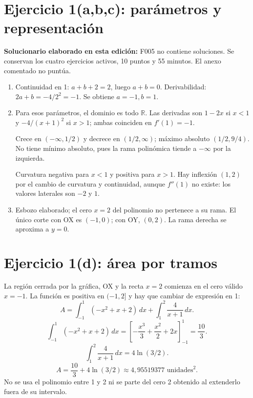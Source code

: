 \documentclass[11pt]{article}
\begin{document}
\section*{Ejercicio 1(a,b,c): parámetros y representación}
\textbf{Solucionario elaborado en esta edición:} F005 no contiene soluciones. Se conservan los cuatro ejercicios activos, 10 puntos y 55 minutos. El anexo comentado no puntúa.
\begin{enumerate}[label=(\alph*)]
\item Continuidad en 1: $a+b+2=2$, luego $a+b=0$. Derivabilidad: $2a+b=-4/2^2=-1$. Se obtiene $\boxed{a=-1,b=1}$.
\item Para esos parámetros, el dominio es todo $\mathbb R$. Las derivadas son $1-2x$ si $x<1$ y $-4/(x+1)^2$ si $x>1$; ambas coinciden en $f'(1)=-1$.

Crece en $(-\infty,1/2)$ y decrece en $(1/2,\infty)$; máximo absoluto $\boxed{(1/2,9/4)}$. No tiene mínimo absoluto, pues la rama polinómica tiende a $-\infty$ por la izquierda.

Curvatura negativa para $x<1$ y positiva para $x>1$. Hay inflexión $(1,2)$ por el cambio de curvatura y continuidad, aunque $f''(1)$ no existe: los valores laterales son $-2$ y $1$.
\item Esbozo elaborado; el cero $x=2$ del polinomio no pertenece a su rama. El único corte con OX es $(-1,0)$; con OY, $(0,2)$. La rama derecha se aproxima a $y=0$.
\end{enumerate}
\begin{center}\end{center}
\clearpage
\section*{Ejercicio 1(d): área por tramos}
La región cerrada por la gráfica, OX y la recta $x=2$ comienza en el cero válido $x=-1$. La función es positiva en $(-1,2]$ y hay que cambiar de expresión en 1:
\[
A=\int_{-1}^{1}(-x^2+x+2)\,dx+\int_1^2\frac4{x+1}\,dx.
\]
\[
\int_{-1}^{1}(-x^2+x+2)\,dx
=\left[-\frac{x^3}{3}+\frac{x^2}{2}+2x\right]_{-1}^1=\frac{10}{3}.
\]
\[
\int_1^2\frac4{x+1}\,dx=4\ln(3/2).
\]
\[
\boxed{A=\frac{10}{3}+4\ln(3/2)\approx4,95519377\text{ unidades}^2}.
\]
No se usa el polinomio entre 1 y 2 ni se parte del cero 2 obtenido al extenderlo fuera de su intervalo.
\clearpage
\end{document}
